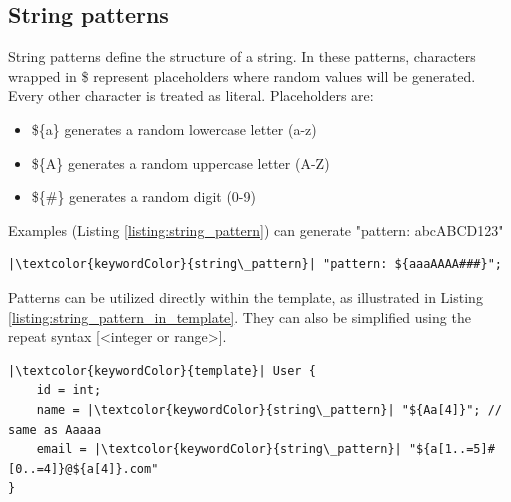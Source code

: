 \documentclass[11pt,a4paper]{article}
\begin{document}
    \subsection{String patterns}
    \par  String patterns define the structure of a string. In these patterns, characters wrapped in \${} 
    represent placeholders where random values will be generated. Every other character is treated as literal. Placeholders are:
    \begin{itemize}
        \item \$\{a\} generates a random lowercase letter (a-z)
        \item \$\{A\} generates a random uppercase letter (A-Z)
        \item \$\{\#\} generates a random digit (0-9)
    \end{itemize}
    Examples (Listing \ref{listing:string_pattern}) can generate "pattern: abcABCD123"
    \begin{listing}[h]
        \begin{verbatim}
|\textcolor{keywordColor}{string\_pattern}| "pattern: ${aaaAAAA###}"; 
        \end{verbatim}
        \caption{String pattern example}
        \centering
        \label{listing:string_pattern}
    \end{listing}
    \par Patterns can be utilized directly within the template, as illustrated in Listing \ref{listing:string_pattern_in_template}. 
    They can also be simplified using the repeat syntax [\textless integer or range\textgreater ].  
    \begin{listing}[H]
       \begin{verbatim}
|\textcolor{keywordColor}{template}| User {
    id = int;
    name = |\textcolor{keywordColor}{string\_pattern}| "${Aa[4]}"; // same as Aaaaa
    email = |\textcolor{keywordColor}{string\_pattern}| "${a[1..=5]#[0..=4]}@${a[4]}.com"
}
        \end{verbatim}
        \caption{String pattern in template example}
        \centering
        \label{listing:string_pattern_in_template}
    \end{listing}

    \pagebreak
\end{document}
